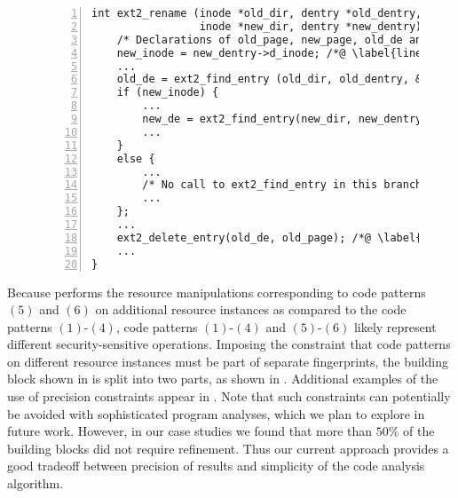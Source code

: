\begin{figure}[ht!]
%
\begin{center}
\newsavebox{\precisionconstraintsmotiv}
\begin{lrbox}{\precisionconstraintsmotiv}
\begin{minipage}[ht]{5.7in}
\begin{lstlisting}[numbers=left, firstnumber=1]
int ext2_rename (inode *old_dir, dentry *old_dentry, 
                 inode *new_dir, dentry *new_dentry) {
    /* Declarations of old_page, new_page, old_de and new_de */
    new_inode = new_dentry->d_inode; /*@ \label{line:preccons:newinodeinit} @*/
    ...
    old_de = ext2_find_entry (old_dir, old_dentry, &old_page); /*@ \label{line:preccons:ext2findentry1} @*/
    if (new_inode) { 
        ...
        new_de = ext2_find_entry(new_dir, new_dentry, &new_page); /*@ \label{line:preccons:ext2findentry2} @*/
        ...
    } 
    else { 
        ...
        /* No call to ext2_find_entry in this branch */
        ...
    };
    ...
    ext2_delete_entry(old_de, old_page); /*@ \label{line:preccons:ext2deleteentry} @*/
    ...
}
\end{lstlisting}
\end{minipage}
\end{lrbox}\fbox{\usebox{\precisionconstraintsmotiv}}
\end{center}
{\label{figure:precision-constraints-eg}}
\end{figure}

Because  performs the resource manipulations corresponding
to code patterns $(5)$ and $(6)$ on additional resource instances as compared
to the code patterns $(1)$-$(4)$, code patterns $(1)$-$(4)$ and $(5)$-$(6)$
likely represent different security-sensitive operations. Imposing the
constraint that code patterns on different resource instances must be part of
separate fingerprints, the building block shown in
 is split into two parts, as shown in
.  Additional examples of the use of
precision constraints appear in .  Note that such
constraints can potentially be avoided with sophisticated program analyses,
which we plan to explore in future work. However, in our case studies we found
that more than $50\%$ of the building blocks did not require refinement.
Thus our current approach provides a good tradeoff between precision of results
and simplicity of the code analysis algorithm.

